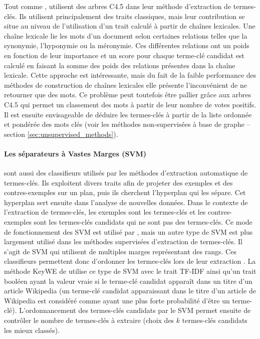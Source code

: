           Tout comme ,
           utilisent des arbres C4.5 dans leur
          méthode d'extraction de termes-clés. Ils utilisent principalement des
          traits classiques, mais leur contribution se situe au niveau de
          l'utilisation d'un trait calculé à partir de chaînes lexicales. Une
          chaîne lexicale lie les mots d'un document selon certaines relations
          telles que la synonymie, l'hyponymie ou la méronymie. Ces différentes
          relations ont un poids en fonction de leur importance et un score pour
          chaque terme-clé candidat est calculé en faisant la somme des poids
          des relations présentes dans la chaîne lexicale. Cette approche est
          intéressante, mais du fait de la faible performance des méthodes de
          construction de chaînes lexicales elle présente l'inconvénient de ne
          retourner que des mots. Ce problème peut toutefois être pallier grâce
          aux arbres C4.5 qui permet un classement des mots à partir de leur
          nombre de votes positifs. Il est ensuite envisageable de déduire les
          termes-clés à partir de la liste ordonnée et pondérée des mots clés
          (voir les méthodes non-supervisées à base de graphe -- section
          \ref{sec:unsupervised_methods}).

        \paragraph{Les séparateurs à Vastes Marges (SVM)}
          sont aussi des classifieurs utilisés par les méthodes d'extraction
          automatique de termes-clés. Ils exploitent divers traits afin de
          projeter des exemples et des contres-exemples sur un plan, puis ils
          cherchent l'hyperplan qui les sépare. Cet hyperplan sert ensuite dans
          l'analyse de nouvelles données. Dans le contexte de l'extraction de
          termes-clés, les exemples sont les termes-clés et les contres-exemples
          sont les termes-clés candidats qui ne sont pas des termes-clés. Ce
          mode de fonctionnement des SVM est utilisé par ,
          mais un autre type de SVM est plus largement utilisé dans les méthodes
          supervisées d'extraction de termes-clés. Il s'agit de SVM qui
          utilisent de multiples marges représentant des rangs. Ces classifieurs
          permettent donc d'ordonner les termes-clés lors de leur extraction
          \cite{herbrich1999svm, joachims2006linearsvm, jiang2009rankingsvm}.
          La méthode KeyWE de  utilise ce type de SVM
          avec le trait TF-IDF ainsi qu'un trait booléen ayant la valeur vraie
          si le terme-clé candidat apparaît dans un titre d'un article Wikipedia
          (un terme-clé candidat apparaissant dans le titre d'un article de
          Wikipedia est considéré comme ayant une plus forte probabilité d'être
          un terme-clé). L'ordonnancement des termes-clés candidats par le SVM
          permet ensuite de contrôler le nombre de termes-clés à extraire (choix
          des $k$ termes-clés candidats les mieux classés).

